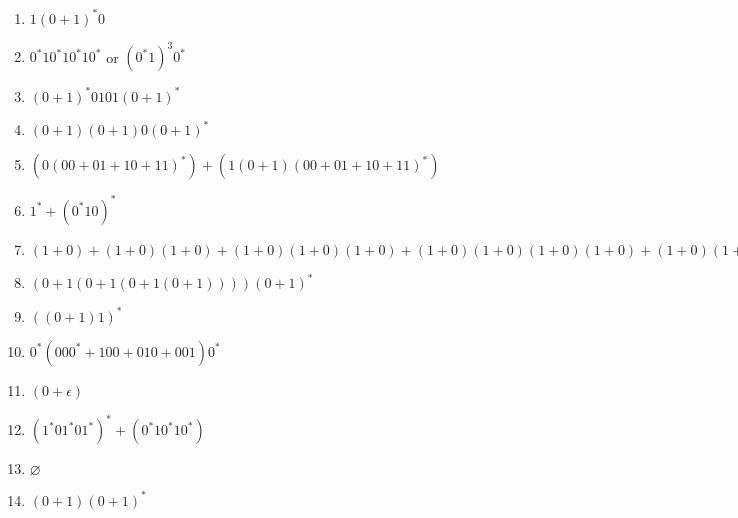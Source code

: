 \begin{enumerate}[label=\textbf{\alph*.}]
	\item $1 (0+1)^* 0$
	\item $0^* 1 0^* 1 0^* 1 0^*$ or $(0^* 1)^3 0^*$
	\item $(0+1)^*0101(0+1)^*$
	\item $(0+1)(0+1)0(0+1)^*$
	\item $(0(00 + 01 + 10 + 11)^*) + (1(0+1)(00 + 01 + 10 + 11)^*)$
	\item $1^* + (0^*10)^*$
	\item $(1+0) + (1+0)(1+0) + (1+0)(1+0)(1+0) + (1+0)(1+0)(1+0)(1+0) + (1+0)(1+0)(1+0)(1+0)(1+0)$
	\item $(0+1(0+1(0+1(0+1))))(0+1)^*$
	\item $((0+1)1)^*$
	\item $0^*(000^* + 100 + 010 + 001)0^*$
	\item $(0 + \epsilon)$
	\item $(1^*01^*01^*)^* + (0^*10^*10^*)$
	\item $\varnothing$
	\item $(0+1)(0+1)^*$
\end{enumerate}
